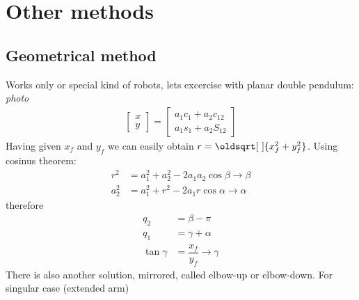 \documentclass[12pt, a4paper]{extarticle}
\renewcommand*{\sqrt}[2][\ ]{\oldsqrt[#1]{#2} }
\begin{document}
	\section{Other methods}
	\subsection{Geometrical method}

	Works only or special kind of robots, lets excercise with planar double pendulum:\\

	\textit{photo}\\
	\begin{align}
		\begin{bmatrix}
			x \\ y
		\end{bmatrix} =
		\begin{bmatrix}
			a_1 c_1 + a_2 c_{12} \\ a_1 s_1 + a_2 S_{12}
		\end{bmatrix}
	\end{align}
	Having given $x_f$ and $y_f$ we can easily obtain $r = \sqrt{x_f^2 + y_f^2}$. Using cosinus theorem:
	\begin{align}
		r^2 &= a_1^2 + a_2^2 - 2 a_1 a_2 \cos \beta \rightarrow \beta \\
		a_2^2 &= a_1^2 + r^2 - 2 a_1 r \cos \alpha \rightarrow \alpha
	\end{align}
	therefore
	\begin{align}
		q_2 &= \beta - \pi \\
		q_1 &= \gamma + \alpha \\
		\tan \gamma &= \dfrac{x_f}{y_f} \rightarrow \gamma
	\end{align}
	There is also another solution, mirrored, called elbow-up or elbow-down.
	For singular case (extended arm)
\end{document}
